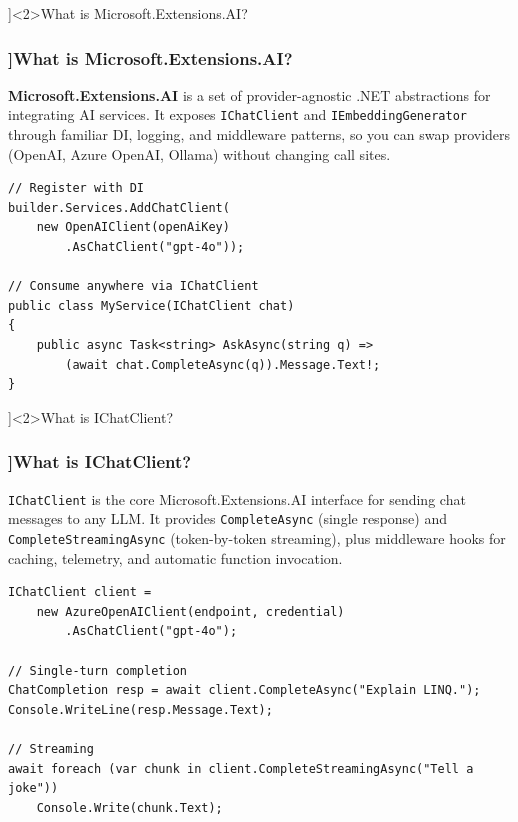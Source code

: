 
\QuestionSlide[\CategoryBadge[AIColor!20]{AI \& .NET}]<2>{What is Microsoft.Extensions.AI?}

\begin{frame}[fragile]
  \frametitle{\AnswerTitle[\CategoryBadge[AIColor!20]{AI \& .NET}]{What is Microsoft.Extensions.AI?}}

  {\footnotesize
  \textbf{Microsoft.Extensions.AI} is a set of provider-agnostic .NET abstractions for integrating AI services.
  It exposes \texttt{IChatClient} and \texttt{IEmbeddingGenerator} through familiar DI, logging, and
  middleware patterns, so you can swap providers (OpenAI, Azure OpenAI, Ollama) without changing call sites.
  }

  \begin{verbatim}
// Register with DI
builder.Services.AddChatClient(
    new OpenAIClient(openAiKey)
        .AsChatClient("gpt-4o"));

// Consume anywhere via IChatClient
public class MyService(IChatClient chat)
{
    public async Task<string> AskAsync(string q) =>
        (await chat.CompleteAsync(q)).Message.Text!;
}
  \end{verbatim}
\end{frame}

\QuestionSlide[\CategoryBadge[AIColor!20]{AI \& .NET}]<2>{What is IChatClient?}

\begin{frame}[fragile]
  \frametitle{\AnswerTitle[\CategoryBadge[AIColor!20]{AI \& .NET}]{What is IChatClient?}}

  {\footnotesize
  \texttt{IChatClient} is the core Microsoft.Extensions.AI interface for sending chat messages to any LLM.
  It provides \texttt{CompleteAsync} (single response) and \texttt{CompleteStreamingAsync} (token-by-token
  streaming), plus middleware hooks for caching, telemetry, and automatic function invocation.
  }

  \begin{verbatim}
IChatClient client =
    new AzureOpenAIClient(endpoint, credential)
        .AsChatClient("gpt-4o");

// Single-turn completion
ChatCompletion resp = await client.CompleteAsync("Explain LINQ.");
Console.WriteLine(resp.Message.Text);

// Streaming
await foreach (var chunk in client.CompleteStreamingAsync("Tell a joke"))
    Console.Write(chunk.Text);
  \end{verbatim}
\end{frame}

